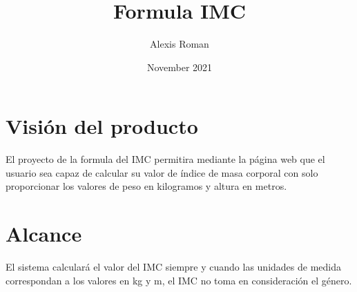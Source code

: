 \documentclass{article}
\title{Formula IMC}
\author{Alexis Roman}
\date{November 2021}
\begin{document}
\maketitle

\section{Visión del producto}

El proyecto de la formula del IMC permitira mediante la página web que el usuario sea capaz de calcular su valor de índice de masa corporal con solo proporcionar los valores de peso en kilogramos y altura en metros.


\section{Alcance}

El sistema calculará el valor del IMC siempre y cuando las unidades de medida correspondan a los valores en kg y m, el IMC no toma en consideración el género.
\end{document}
